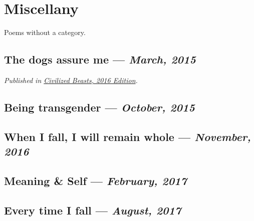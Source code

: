 \documentclass[10pt]{memoir}
\begin{document}
  
  \newpage


  \chapter{Miscellany}

  Poems without a category.
  \thispagestyle{empty}
  \newpage


  \section{The dogs assure me --- \textit{March, 2015}}

  

  \textit{Published in \underline{Civilized Beasts, 2016 Edition}.}
  \cleartoverso


  \section{Being transgender --- \textit{October, 2015}}

  
  \newpage


  \section{When I fall, I will remain whole --- \textit{November, 2016}}

  
  \cleartoverso


  \section{Meaning \& Self --- \textit{February, 2017}}

  
  \newpage

  \section{Every time I fall --- \textit{August, 2017}}

  
\end{document}
